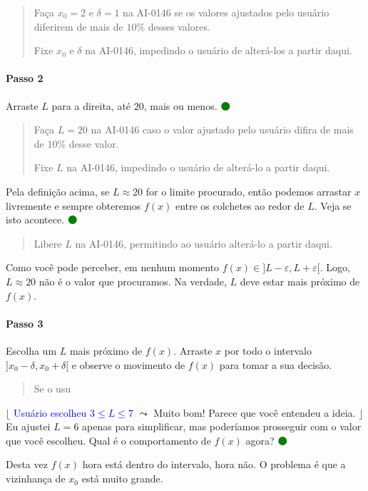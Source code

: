 \documentclass[fleqn,12pt]{article}
\newenvironment{ct}{\begin{quotation}\color{red!30!black}\sffamily\small}{\end{quotation}} %
\newcommand\proceed{\textcolor{green}{$\medbullet$}\xspace}
\newcommand\condicional[2]{$\lfloor$%
	\textsf{\textcolor{blue}{{\footnotesize #1}}}
	$\leadsto$ #2%
	$\rfloor$}
\begin{document}
    \begin{ct}
	Faça $x_0 = 2$ e $\delta = 1$ na AI-0146 se os valores ajustados pelo usuário diferirem de mais de $10\%$ desses valores.

	Fixe $x_0$ e $\delta$ na AI-0146, impedindo o usuário de alterá-los a partir daqui.
    \end{ct}

    \paragraph{Passo 2} Arraste $L$ para a direita, até $20$, mais ou menos. \proceed

    \begin{ct}
	Faça $L = 20$ na AI-0146 caso o valor ajustado pelo usuário difira de mais de $10\%$ desse valor.

	Fixe $L$ na AI-0146, impedindo o usuário de alterá-lo a partir daqui.
    \end{ct}

    Pela definição acima, se $L \approx 20$ for o limite procurado, então podemos arrastar $x$ livremente e sempre obteremos $f(x)$ entre os colchetes ao redor de $L$. Veja se isto acontece. \proceed

    \begin{ct}
	Libere $L$ na AI-0146, permitindo ao usuário alterá-lo a partir daqui.
    \end{ct}

    Como você pode perceber, em nenhum momento $f(x) \in ]L - \varepsilon, L + \varepsilon[$. Logo, $L \approx 20$ não é o valor que procuramos. Na verdade, $L$ deve estar mais próximo de $f(x)$.

    \paragraph{Passo 3} Escolha um $L$ mais próximo de $f(x)$. Arraste $x$ por todo o intervalo $]x_0 - \delta, x_0 + \delta[$ e observe o movimento de $f(x)$ para tomar a sua decisão.

    \begin{ct}
	Se o usu
    \end{ct}

    \condicional{Usuário escolheu $3 \le L \le 7$}{Muito bom! Parece que você entendeu a ideia.} Eu ajustei $L = 6$ apenas para simplificar, mas poderíamos prosseguir com o valor que você escolheu. Qual é o comportamento de $f(x)$ agora? \proceed

    Desta vez $f(x)$ hora está dentro do intervalo, hora não. O problema é que a vizinhança de $x_0$ está muito grande.
\end{document}
